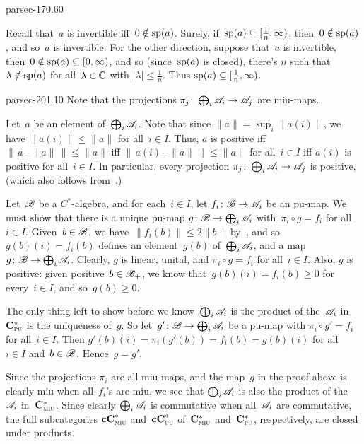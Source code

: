 \documentclass[b5page]{book}
\begin{document}
\begin{solution}{parsec-170.60}
\begin{enumerate}
Recall that~$a$ is invertible iff~$0\notin\mathrm{sp}(a)$.
Surely, if~$\mathrm{sp}(a)\subseteq [\frac{1}{n},\infty)$,
then~$0\notin \mathrm{sp}(a)$, and so~$a$ is invertible.
For the other direction,
suppose that~$a$ is invertible,
then~$0\notin \mathrm{sp}(a)\subseteq [0,\infty)$,
and so (since~$\mathrm{sp}(a)$ is closed),
there's $n$ such that~$\lambda\notin \mathrm{sp}(a)$
for all~$\lambda\in \mathbb{C}$ with $\left|\lambda\right|\leq \frac{1}{n}$.
Thus $\mathrm{sp}(a)\subseteq[\frac{1}{n},\infty)$.
\end{enumerate}
\end{solution}
\begin{solution}{parsec-201.10}
Note that the projections
$\pi_j\colon\bigoplus_i \mathscr{A}_i\to \mathscr{A}_j$
are miu-maps.

Let~$a$ be an element of~$\bigoplus_i \mathscr{A}_i$.
Note that since
    $\|a\|=\sup_i\|a(i)\|$, we have $\|a(i)\|\leq \|a\|$ for all~$i\in I$.
Thus, $a$ is positive iff
$\|\,a-\|a\|\,\|\leq\|a\|$
    iff $\|\,a(i)-\|a\|\,\|\leq \|a\|$
    for all~$i\in I$
    iff $a(i)$ is positive for all~$i\in I$.
In particular,
every projection $\pi_j\colon \bigoplus_i\mathscr{A}_i\to\mathscr{A}_j$
is positive,
    (which also follows from~.)

Let~$\mathscr{B}$ be a $C^*$-algebra,
and for each~$i\in I$,
let $f_i\colon \mathscr{B} \to \mathscr{A}_i$ be an pu-map.
We must show that there is a unique
    pu-map $g\colon \mathscr{B}\to \bigoplus_i \mathscr{A}_i $
    with~$\pi_i\circ g = f_i$ for all~$i\in I$.
Given~$b\in \mathscr{B}$,
    we have~$\|f_i(b)\|\leq 2\|b\|$
    by~,
    and so $g(b)(i)=f_i(b)$
    defines an element~$g(b)$ of~$\bigoplus_i\mathscr{A}_i$,
    and a map~$g\colon \mathscr{B}\to\bigoplus_i\mathscr{A}_i$.
Clearly, $g$ is linear, unital,
    and $\pi_i\circ g = f_i$ for all~$i\in I$.
Also, $g$ is positive:
given positive~$b\in \mathscr{B}_+$,
we know that~$g(b)(i)=f_i(b)\geq 0$ for every~$i\in I$,
    and so~$g(b)\geq 0$.

The only thing left to show
before we know~$\bigoplus_i \mathscr{A}_i$
is the product of the~$\mathscr{A}_i$
    in~$\mathbf{C}^*_{\text{\textsc{pu}}}$
    is the uniqueness of~$g$.
So let~$g'\colon \mathscr{B}\to\bigoplus_i\mathscr{A}_i$
be a pu-map
with $\pi_i\circ g' =f_i$ for all~$i\in I$.
Then 
    $g'(b)(i)=\pi_i(g'(b))
    = f_i(b) = g(b)(i)$
    for all~$i\in I$ and~$b\in\mathscr{B}$.
    Hence~$g=g'$.

Since the projections $\pi_i$ are all miu-maps,
and the map~$g$ in the proof above is clearly miu when all~$f_i$'s are miu,
we see that $\bigoplus_i\mathscr{A}_i$ is also the product
    of the~$\mathscr{A}_i$ in~$\mathbf{C}^*_{\text{\textsc{miu}}}$.
Since clearly $\bigoplus_i \mathscr{A}_i$ is commutative
when all~$\mathscr{A}_i$ are commutative,
the full subcategories
    $\mathbf{cC}^*_{\text{\textsc{miu}}}$ and~$\mathbf{cC}^*_{\text{\textsc{pu}}}$
    of~$\mathbf{C}^*_{\text{\textsc{miu}}}$ and~$\mathbf{C}^*_{\text{\textsc{pu}}}$, respectively,
    are closed under products.
\end{solution}
\end{document}
